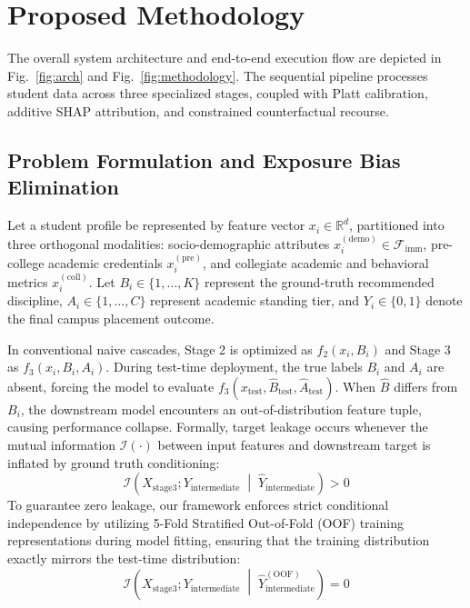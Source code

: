 \documentclass[conference]{IEEEtran}
\begin{document}
\section{Proposed Methodology}
The overall system architecture and end-to-end execution flow are depicted in Fig.~\ref{fig:arch} and Fig.~\ref{fig:methodology}. The sequential pipeline processes student data across three specialized stages, coupled with Platt calibration, additive SHAP attribution, and constrained counterfactual recourse.

\subsection{Problem Formulation and Exposure Bias Elimination}
Let a student profile be represented by feature vector $x_i \in \mathbb{R}^d$, partitioned into three orthogonal modalities: socio-demographic attributes $x_i^{(\text{demo})} \in \mathcal{F}_{\text{imm}}$, pre-college academic credentials $x_i^{(\text{pre})}$, and collegiate academic and behavioral metrics $x_i^{(\text{coll})}$. Let $B_i \in \{1,\dots,K\}$ represent the ground-truth recommended discipline, $A_i \in \{1,\dots,C\}$ represent academic standing tier, and $Y_i \in \{0,1\}$ denote the final campus placement outcome.

In conventional naive cascades, Stage 2 is optimized as $f_2(x_i, B_i)$ and Stage 3 as $f_3(x_i, B_i, A_i)$. During test-time deployment, the true labels $B_i$ and $A_i$ are absent, forcing the model to evaluate $f_3(x_{\text{test}}, \hat{B}_{\text{test}}, \hat{A}_{\text{test}})$. When $\hat{B}$ differs from $B_i$, the downstream model encounters an out-of-distribution feature tuple, causing performance collapse. Formally, target leakage occurs whenever the mutual information $\mathcal{I}(\cdot)$ between input features and downstream target is inflated by ground truth conditioning:
\begin{equation}
\mathcal{I}\left(X_{\text{stage3}}; Y_{\text{intermediate}} \;\middle|\; \hat{Y}_{\text{intermediate}}\right) > 0
\label{eq:leakage}
\end{equation}
To guarantee zero leakage, our framework enforces strict conditional independence by utilizing 5-Fold Stratified Out-of-Fold (OOF) training representations during model fitting, ensuring that the training distribution exactly mirrors the test-time distribution:
\begin{equation}
\mathcal{I}\left(X_{\text{stage3}}; Y_{\text{intermediate}} \;\middle|\; \hat{Y}_{\text{intermediate}}^{(\text{OOF})}\right) = 0
\label{eq:noleakage}
\end{equation}
\end{document}
